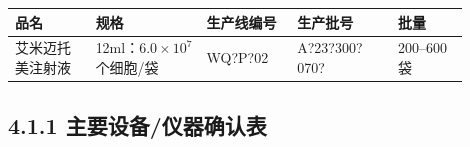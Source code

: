 \documentclass[UTF8,10pt,a4paper,fontset=fandol]{ctexart}
\newcommand{\fieldvalue}[1]{#1}
\newcommand{\handwritten}[1]{#1}
\begin{document}
\begin{tabular}{|p{0.16\linewidth}|p{0.22\linewidth}|p{0.18\linewidth}|p{0.20\linewidth}|p{0.14\linewidth}|}
\hline
品名 & 规格 & 生产线编号 & 生产批号 & 批量 \\
\hline
\fieldvalue{艾米迈托美注射液} &
\fieldvalue{12ml：$6.0\times 10^{7}$个细胞/袋} &
\fieldvalue{\handwritten{WQ?P?02}} &
\fieldvalue{\handwritten{A?23?300?070?}} &
\fieldvalue{200--600袋} \\
\hline
\end{tabular}

\subsection*{4.1.1 主要设备/仪器确认表}
\end{document}
